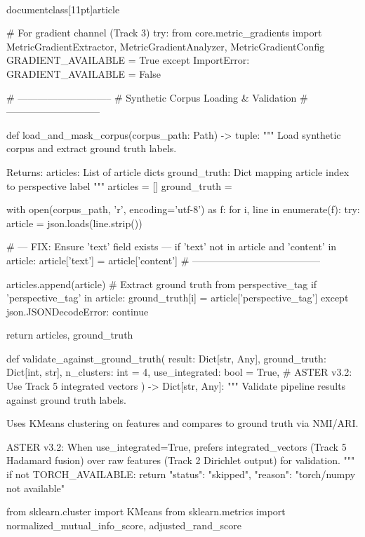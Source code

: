 \\documentclass[11pt]{article}
\begin{document}
\begin{CodeBlock}
# For gradient channel (Track 3)
try:
    from core.metric_gradients import MetricGradientExtractor, MetricGradientAnalyzer, MetricGradientConfig
    GRADIENT_AVAILABLE = True
except ImportError:
    GRADIENT_AVAILABLE = False


# -----------------------------
# Synthetic Corpus Loading & Validation
# -----------------------------

def load_and_mask_corpus(corpus_path: Path) -> tuple:
    """
    Load synthetic corpus and extract ground truth labels.

    Returns:
        articles: List of article dicts
        ground_truth: Dict mapping article index to perspective label
    """
    articles = []
    ground_truth = {}

    with open(corpus_path, 'r', encoding='utf-8') as f:
        for i, line in enumerate(f):
            try:
                article = json.loads(line.strip())
                
                # --- FIX: Ensure 'text' field exists ---
                if 'text' not in article and 'content' in article:
                    article['text'] = article['content']
                # ---------------------------------------

                articles.append(article)
                # Extract ground truth from perspective_tag
                if 'perspective_tag' in article:
                    ground_truth[i] = article['perspective_tag']
            except json.JSONDecodeError:
                continue

    return articles, ground_truth


def validate_against_ground_truth(
    result: Dict[str, Any],
    ground_truth: Dict[int, str],
    n_clusters: int = 4,
    use_integrated: bool = True,  # ASTER v3.2: Use Track 5 integrated vectors
) -> Dict[str, Any]:
    """
    Validate pipeline results against ground truth labels.

    Uses KMeans clustering on features and compares to ground truth via NMI/ARI.

    ASTER v3.2: When use_integrated=True, prefers integrated_vectors (Track 5 Hadamard fusion)
    over raw features (Track 2 Dirichlet output) for validation.
    """
    if not TORCH_AVAILABLE:
        return {"status": "skipped", "reason": "torch/numpy not available"}

    from sklearn.cluster import KMeans
    from sklearn.metrics import normalized_mutual_info_score, adjusted_rand_score


\end{CodeBlock}
\end{document}
